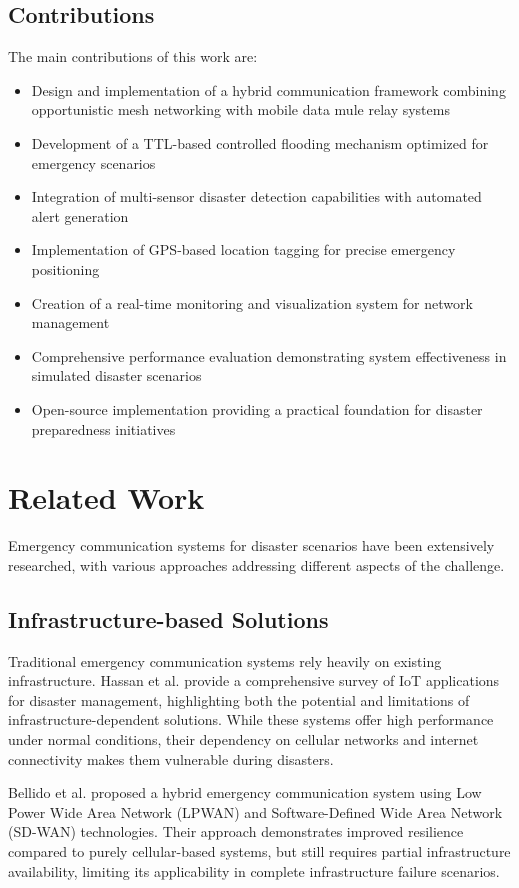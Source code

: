 \documentclass[conference]{IEEEtran}
\begin{document}
\subsection{Contributions}

The main contributions of this work are:
\begin{itemize}
\item Design and implementation of a hybrid communication framework combining opportunistic mesh networking with mobile data mule relay systems
\item Development of a TTL-based controlled flooding mechanism optimized for emergency scenarios
\item Integration of multi-sensor disaster detection capabilities with automated alert generation
\item Implementation of GPS-based location tagging for precise emergency positioning
\item Creation of a real-time monitoring and visualization system for network management
\item Comprehensive performance evaluation demonstrating system effectiveness in simulated disaster scenarios
\item Open-source implementation providing a practical foundation for disaster preparedness initiatives
\end{itemize}

\section{Related Work}

Emergency communication systems for disaster scenarios have been extensively researched, with various approaches addressing different aspects of the challenge.

\subsection{Infrastructure-based Solutions}

Traditional emergency communication systems rely heavily on existing infrastructure. Hassan et al. \cite{Hassan2017} provide a comprehensive survey of IoT applications for disaster management, highlighting both the potential and limitations of infrastructure-dependent solutions. While these systems offer high performance under normal conditions, their dependency on cellular networks and internet connectivity makes them vulnerable during disasters.

Bellido et al. \cite{Bellido2023} proposed a hybrid emergency communication system using Low Power Wide Area Network (LPWAN) and Software-Defined Wide Area Network (SD-WAN) technologies. Their approach demonstrates improved resilience compared to purely cellular-based systems, but still requires partial infrastructure availability, limiting its applicability in complete infrastructure failure scenarios.
\end{document}
